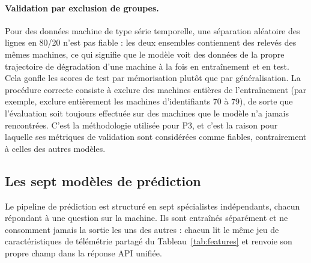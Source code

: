 \paragraph{Validation par exclusion de groupes.}
Pour des données machine de type série temporelle, une séparation aléatoire des lignes en 80/20 n'est pas fiable : les deux ensembles contiennent des relevés des mêmes machines, ce qui signifie que le modèle voit des données de la propre trajectoire de dégradation d'une machine à la fois en entraînement et en test. Cela gonfle les scores de test par mémorisation plutôt que par généralisation. La procédure correcte consiste à exclure des machines entières de l'entraînement (par exemple, exclure entièrement les machines d'identifiants 70 à 79), de sorte que l'évaluation soit toujours effectuée sur des machines que le modèle n'a jamais rencontrées. C'est la méthodologie utilisée pour P3, et c'est la raison pour laquelle ses métriques de validation sont considérées comme fiables, contrairement à celles des autres modèles.

\subsection{Les sept modèles de prédiction}

Le pipeline de prédiction est structuré en sept spécialistes indépendants, chacun répondant à une question sur la machine. Ils sont entraînés séparément et ne consomment jamais la sortie les uns des autres : chacun lit le même jeu de caractéristiques de télémétrie partagé du Tableau~\ref{tab:features} et renvoie son propre champ dans la réponse API unifiée.

